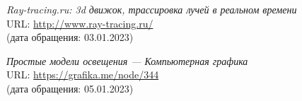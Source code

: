\begin{thebibliography}{99}

{\itshape Ray-tracing.ru: 3d движок, трассировка лучей в реальном времени}\\
URL: \url{http://www.ray-tracing.ru/}\\
(дата обращения: 03.01.2023)

{\itshape Простые модели освещения --- Компьютерная графика}\\
URL: \url{https://grafika.me/node/344}\\
(дата обращения: 05.01.2023)


\end{thebibliography}
